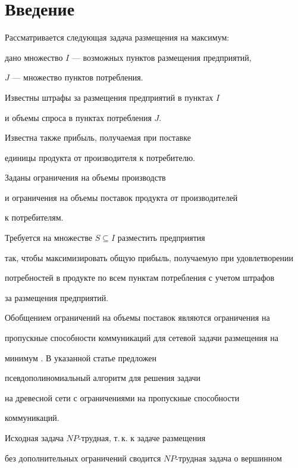\label{begin}





\section{Введение}





Рассматривается следующая задача размещения на максимум:


дано множество $I$ --- возможных пунктов размещения предприятий,


$J$ --- множество пунктов потребления.


Известны штрафы за размещения предприятий в пунктах $I$


и объемы спроса в пунктах потребления $J$.


Известна также прибыль, получаемая при поставке 


единицы продукта от производителя к потребителю.


Заданы ограничения на объемы производств


и ограничения на объемы поставок продукта от производителей 


к потребителям. 


Требуется на множестве $S \subseteq I$ разместить предприятия


так, чтобы максимизировать общую прибыль, получаемую при удовлетворении 


потребностей в продукте по всем пунктам потребления с учетом штрафов 


за размещения предприятий.





Обобщением ограничений на объемы поставок являются ограничения на


пропускные способности коммуникаций для сетевой задачи размещения на 


минимум \cite{V99}. В указанной статье предложен 


псевдополиномиальный алгоритм для решения задачи


на древесной сети с ограничениями на пропускные способности


коммуникаций.





Исходная задача $NP$-трудная, т.\,к. к задаче размещения 


без дополнительных ограничений сводится $NP$-трудная задача о вершинном 


